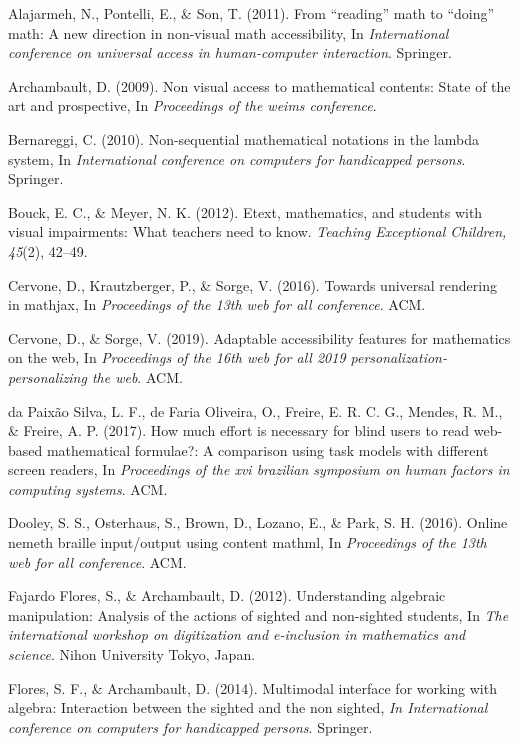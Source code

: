 \documentclass[11.5pt]{sig-alternate} %
\begin{document}
\leftskip 0.25in
\parindent -0.25in 

Alajarmeh, N., Pontelli, E., \& Son, T. (2011). From “reading” math to “doing” math: A new direction in non-visual math accessibility, In \textit{International conference on universal access in human-computer interaction}. Springer.

Archambault, D. (2009). Non visual access to mathematical contents: State of the art and prospective, In \textit{Proceedings of the weims conference}.

Bernareggi, C. (2010). Non-sequential mathematical notations in the lambda system, In \textit{International conference on computers for handicapped persons}. Springer.

Bouck, E. C., \& Meyer, N. K. (2012). Etext, mathematics, and students with visual impairments: What teachers need to know. \textit{Teaching Exceptional Children, 45}(2), 42–49.

Cervone, D., Krautzberger, P., \& Sorge, V. (2016). Towards universal rendering in mathjax, In \textit{Proceedings of the 13th web for all conference}. ACM.

Cervone, D., \& Sorge, V. (2019). Adaptable accessibility features for mathematics on the web, In \textit{Proceedings of the 16th web for all 2019 personalization-personalizing the web}. ACM.

da Paixão Silva, L. F., de Faria Oliveira, O., Freire, E. R. C. G., Mendes, R. M., \& Freire, A. P. (2017). How much effort is necessary for blind users to read web-based mathematical formulae?: A comparison using task models with different screen readers, In \textit{Proceedings of the xvi brazilian symposium on human factors in computing systems}. ACM.

Dooley, S. S., Osterhaus, S., Brown, D., Lozano, E., \& Park, S. H. (2016). Online nemeth braille input/output using content mathml, In \textit{Proceedings of the 13th web for all conference}. ACM.

Fajardo Flores, S., \& Archambault, D. (2012). Understanding algebraic manipulation: Analysis of the actions of sighted and non-sighted students, In \textit{The international workshop on digitization and e-inclusion in mathematics and science}. Nihon University Tokyo, Japan.
 
Flores, S. F., \& Archambault, D. (2014). Multimodal interface for working with algebra: Interaction between the sighted and the non sighted, \textit{In International conference on computers for handicapped persons}. Springer.
\end{document}
